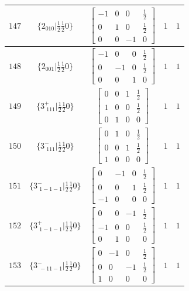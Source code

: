 \documentclass[fleqn,8pt]{jsarticle}
\begin{document}
\begin{longtable}{ccccc}
$ 147 $ & $ \{2{}_{010}|\frac{1}{2} \frac{1}{2} 0\} $ & $ \begin{bmatrix} -1 & 0 & 0 & \frac{1}{2} \\ 0 & 1 & 0 & \frac{1}{2} \\ 0 & 0 & -1 & 0 \end{bmatrix} $ & $ 1 $ & $ 1 $ \\ \hline
$ 148 $ & $ \{2{}_{001}|\frac{1}{2} \frac{1}{2} 0\} $ & $ \begin{bmatrix} -1 & 0 & 0 & \frac{1}{2} \\ 0 & -1 & 0 & \frac{1}{2} \\ 0 & 0 & 1 & 0 \end{bmatrix} $ & $ 1 $ & $ 1 $ \\ \hline
$ 149 $ & $ \{3^{+}_{\,\,111}|\frac{1}{2} \frac{1}{2} 0\} $ & $ \begin{bmatrix} 0 & 0 & 1 & \frac{1}{2} \\ 1 & 0 & 0 & \frac{1}{2} \\ 0 & 1 & 0 & 0 \end{bmatrix} $ & $ 1 $ & $ 1 $ \\ \hline
$ 150 $ & $ \{3^{-}_{\,\,111}|\frac{1}{2} \frac{1}{2} 0\} $ & $ \begin{bmatrix} 0 & 1 & 0 & \frac{1}{2} \\ 0 & 0 & 1 & \frac{1}{2} \\ 1 & 0 & 0 & 0 \end{bmatrix} $ & $ 1 $ & $ 1 $ \\ \hline
$ 151 $ & $ \{3^{-}_{\,\,1-1-1}|\frac{1}{2} \frac{1}{2} 0\} $ & $ \begin{bmatrix} 0 & -1 & 0 & \frac{1}{2} \\ 0 & 0 & 1 & \frac{1}{2} \\ -1 & 0 & 0 & 0 \end{bmatrix} $ & $ 1 $ & $ 1 $ \\ \hline
$ 152 $ & $ \{3^{+}_{\,\,1-1-1}|\frac{1}{2} \frac{1}{2} 0\} $ & $ \begin{bmatrix} 0 & 0 & -1 & \frac{1}{2} \\ -1 & 0 & 0 & \frac{1}{2} \\ 0 & 1 & 0 & 0 \end{bmatrix} $ & $ 1 $ & $ 1 $ \\ \hline
$ 153 $ & $ \{3^{-}_{\,\,-11-1}|\frac{1}{2} \frac{1}{2} 0\} $ & $ \begin{bmatrix} 0 & -1 & 0 & \frac{1}{2} \\ 0 & 0 & -1 & \frac{1}{2} \\ 1 & 0 & 0 & 0 \end{bmatrix} $ & $ 1 $ & $ 1 $ \\ \hline

\end{longtable}
\end{document}
